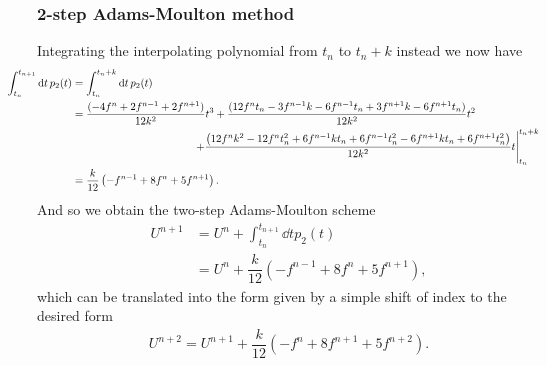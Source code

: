 \documentclass[12pt]{article}
\begin{document}
\subsubsection*{2-step Adams-Moulton method}
Integrating the interpolating polynomial from $t_{n}$ to $t_{n}+k$ instead we now have
\begin{subequations}
    \begin{align}
    \hspace{-1cm}\int_{t_{n}}^{t_{n+1}}\dd{t}p_{2}(t) &= \int_{t_{n}}^{t_{n}+k}\dd{t}p_{2}(t)\\
    &= \frac{(-4f^{n}+2f^{n-1}+2f^{n+1})}{12k^2}t^3 +\frac{(12f^{n}
        t_{n}-3f^{n-1}k-6f^{n-1}t_{n}+3f^{n+1}k-6f^{n+1}t_{n})}{12 k^2}t^2\nonumber \\ 
    &\hspace{4cm}\left.+\frac{\left(12f^{n}k^2-12f^{n}t_{n}^2+6
        f^{n-1} k t_{n}+6 f^{n-1} t_{n}^2-6f^{n+1}k t_{n}+6
        f^{n+1}t_{n}^2\right)}{12 k^2}t\right|_{t_{n}}^{t_{n}+k}\\
    &= \dfrac{k}{12}\left(-f^{n-1}+8f^{n}+5f^{n+1}\right).
    \end{align}
\end{subequations}
And so we obtain the two-step Adams-Moulton scheme
\begin{subequations}
    \begin{align}
        U^{n+1} &= U^{n} + \int_{t_{n}}^{t_{n+1}}\dd{t}p_{2}(t)\\
        &= U^{n} + \dfrac{k}{12}(-f^{n-1}+8f^{n}+5f^{n+1}),
    \end{align}
\end{subequations}
which can be translated into the form given by a simple shift of index to the desired form
\begin{align}
    U^{n+2} = U^{n+1} + \dfrac{k}{12}(-f^{n}+8f^{n+1}+5f^{n+2}).
\end{align}
\end{document}
